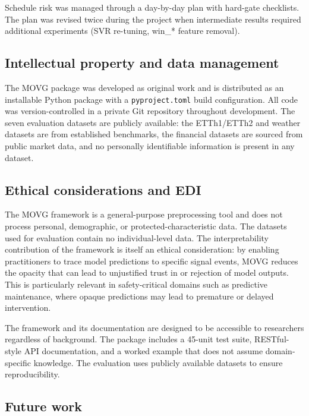\documentclass[a4paper,12pt]{article}
\begin{document}
Schedule risk was managed through a day-by-day plan with hard-gate checklists. The plan was revised twice during the project when intermediate results required additional experiments (SVR re-tuning, win\_* feature removal).

\subsection{Intellectual property and data management}
\label{sec:constr_ip}

The MOVG package was developed as original work and is distributed as an installable Python package with a \texttt{pyproject.toml} build configuration. All code was version-controlled in a private Git repository throughout development. The seven evaluation datasets are publicly available: the ETTh1/ETTh2 and weather datasets are from established benchmarks, the financial datasets are sourced from public market data, and no personally identifiable information is present in any dataset.

\subsection{Ethical considerations and EDI}
\label{sec:constr_ethics}

The MOVG framework is a general-purpose preprocessing tool and does not process personal, demographic, or protected-characteristic data. The datasets used for evaluation contain no individual-level data. The interpretability contribution of the framework is itself an ethical consideration: by enabling practitioners to trace model predictions to specific signal events, MOVG reduces the opacity that can lead to unjustified trust in or rejection of model outputs. This is particularly relevant in safety-critical domains such as predictive maintenance, where opaque predictions may lead to premature or delayed intervention.

The framework and its documentation are designed to be accessible to researchers regardless of background. The package includes a 45-unit test suite, RESTful-style API documentation, and a worked example that does not assume domain-specific knowledge. The evaluation uses publicly available datasets to ensure reproducibility.

\subsection{Future work}
\label{sec:constr_future}
\end{document}
